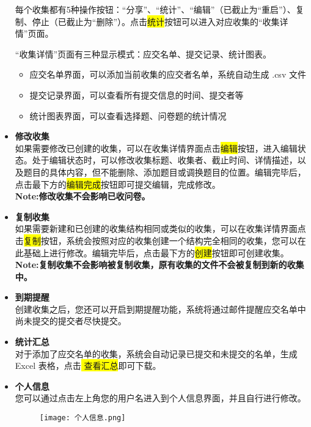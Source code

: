 \documentclass[lang=cn,11pt,a4paper]{elegantpaper}
\newcommand{\hlc}[2][yellow]{\colorbox{#1}{#2}} %
\begin{document}
\begin{itemize}
	每个收集都有5种操作按钮：“分享”、“统计”、“编辑”（已截止为“重启”）、复制、停止（已截止为“删除”）。点击\hlc{统计}按钮可以进入对应收集的“收集详情”页面。
	
	“收集详情”页面有三种显示模式：应交名单、提交记录、统计图表。
	\begin{itemize}
		\item 应交名单界面，可以添加当前收集的应交者名单，系统自动生成 .csv 文件
		\item 提交记录界面，可以查看所有提交信息的时间、提交者等
		\item 统计图表界面，可以查看选择题、问卷题的统计情况
	\end{itemize}
	\item{\bf 修改收集}\\
	如果需要修改已创建的收集，可以在收集详情界面点击\hlc{编辑}按钮，进入编辑状态。处于编辑状态时，可以修改收集标题、收集者、截止时间、详情描述，以及题目的具体内容，但不能删除、添加题目或调换题目的位置。编辑完毕后，点击最下方的\hlc{编辑完成}按钮即可提交编辑，完成修改。\\
	{\bf Note:修改收集不会影响已收问卷。}
	\item{\bf 复制收集}\\
	如果需要新建和已创建的收集结构相同或类似的收集，可以在收集详情界面点击\hlc{复制}按钮，系统会按照对应的收集创建一个结构完全相同的收集，您可以在此基础上进行修改。编辑完毕后，点击最下方的\hlc{创建}按钮即可创建收集。\\
	{\bf Note:复制收集不会影响被复制收集，原有收集的文件不会被复制到新的收集中。}
	\item {\bf  到期提醒}\\
	创建收集之后，您还可以开启到期提醒功能，系统将通过邮件提醒应交名单中尚未提交的提交者尽快提交。
	\item {\bf 统计汇总}\\
	对于添加了应交名单的收集，系统会自动记录已提交和未提交的名单，生成 Excel 表格，点击\hlc{ 查看汇总}即可下载。
	\item {\bf 个人信息}\\
	您可以通过点击左上角您的用户名进入到个人信息界面，并且自行进行修改。
			\begin{figure}[!htb]
		\centering
		\texttt{[image: 个人信息.png]}
	\end{figure}
\end{itemize}
\end{document}
